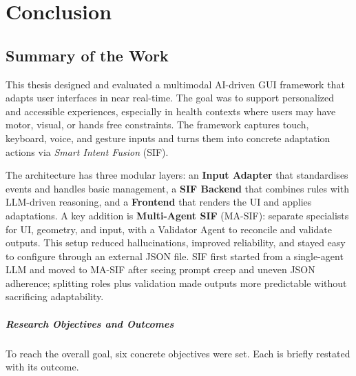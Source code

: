 \chapter{Conclusion}

\section{Summary of the Work}
This thesis designed and evaluated a multimodal AI-driven GUI framework that adapts user interfaces in near real-time. The goal was to support personalized and accessible experiences, especially in health contexts where users may have motor, visual, or hands free constraints. The framework captures touch, keyboard, voice, and gesture inputs and turns them into concrete adaptation actions via \emph{Smart Intent Fusion} (SIF).

The architecture has three modular layers: an \textbf{Input Adapter} that standardises events and handles basic management, a \textbf{SIF Backend} that combines rules with LLM-driven reasoning, and a \textbf{Frontend} that renders the UI and applies adaptations. A key addition is \textbf{Multi-Agent SIF} (MA-SIF): separate specialists for UI, geometry, and input, with a Validator Agent to reconcile and validate outputs. This setup reduced hallucinations, improved reliability, and stayed easy to configure through an external JSON file. SIF first started from a single-agent LLM and moved to MA-SIF after seeing prompt creep and uneven JSON adherence; splitting roles plus validation made outputs more predictable without sacrificing adaptability.

\paragraph{Research Objectives and Outcomes}
To reach the overall goal, six concrete objectives were set. Each is briefly restated with its outcome.

